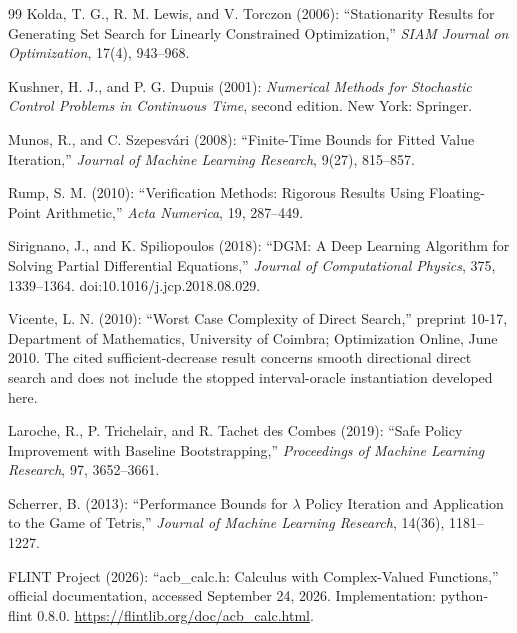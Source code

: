 \begin{thebibliography}{99}
Kolda, T. G., R. M. Lewis, and V. Torczon (2006): ``Stationarity Results for Generating Set Search for Linearly Constrained Optimization,'' \emph{SIAM Journal on Optimization}, 17(4), 943--968.


Kushner, H. J., and P. G. Dupuis (2001): \emph{Numerical Methods for Stochastic Control Problems in Continuous Time}, second edition. New York: Springer.


Munos, R., and C. Szepesv\'ari (2008): ``Finite-Time Bounds for Fitted Value Iteration,'' \emph{Journal of Machine Learning Research}, 9(27), 815--857.


Rump, S. M. (2010): ``Verification Methods: Rigorous Results Using Floating-Point Arithmetic,'' \emph{Acta Numerica}, 19, 287--449.


Sirignano, J., and K. Spiliopoulos (2018): ``DGM: A Deep Learning Algorithm for Solving Partial Differential Equations,'' \emph{Journal of Computational Physics}, 375, 1339--1364. doi:10.1016/j.jcp.2018.08.029.


Vicente, L. N. (2010): ``Worst Case Complexity of Direct Search,'' preprint 10-17, Department of Mathematics, University of Coimbra; Optimization Online, June 2010. The cited sufficient-decrease result concerns smooth directional direct search and does not include the stopped interval-oracle instantiation developed here.


Laroche, R., P. Trichelair, and R. Tachet des Combes (2019): ``Safe Policy Improvement with Baseline Bootstrapping,'' \emph{Proceedings of Machine Learning Research}, 97, 3652--3661.

Scherrer, B. (2013): ``Performance Bounds for $\lambda$ Policy Iteration and Application to the Game of Tetris,'' \emph{Journal of Machine Learning Research}, 14(36), 1181--1227.

FLINT Project (2026): ``acb\_calc.h: Calculus with Complex-Valued Functions,'' official documentation, accessed September 24, 2026. Implementation: python-flint 0.8.0. \url{https://flintlib.org/doc/acb_calc.html}.

\end{thebibliography}
